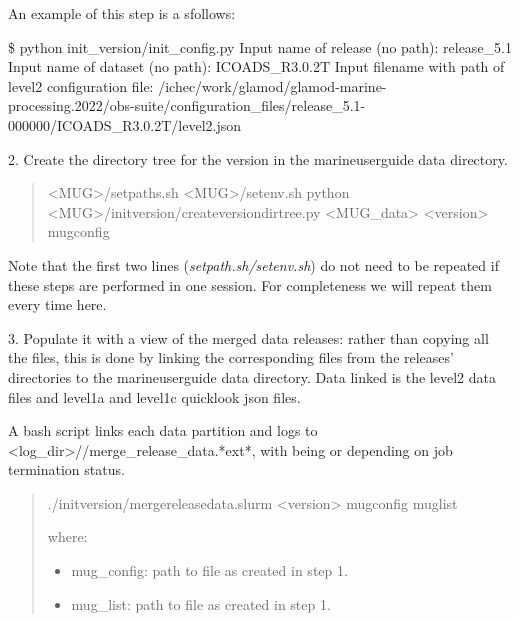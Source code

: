 \documentclass[letterpaper,10pt,english]{sphinxmanual}
\begin{document}
An example of this step is a sfollows:

\begin{sphinxVerbatim}[commandchars=\\\{\}]
\$ python init_version/init_config.py
Input name of release (no path): release_5.1
Input name of dataset (no path): ICOADS_R3.0.2T
Input filename with path of level2 configuration file: /ichec/work/glamod/glamod-marine-processing.2022/obs-suite/configuration_files/release_5.1-000000/ICOADS_R3.0.2T/level2.json
\end{sphinxVerbatim}

2. Create the directory tree for the version in the marine\sphinxhyphen{}user\sphinxhyphen{}guide data directory.
\begin{quote}

\begin{sphinxVerbatim}[commandchars=\\\{\}]
 <MUG>/setpaths.sh
 <MUG>/setenv.sh
python <MUG>/init\PYGZus{}version/create\PYGZus{}version\PYGZus{}dir\PYGZus{}tree.py <MUG\_data> <version> mug\PYGZus{}config
\end{sphinxVerbatim}

\end{quote}

Note that the first two lines (\textit{setpath.sh/setenv.sh}) do not need to be repeated if these steps are performed in one session. For completeness we will repeat them every time here.

3. Populate it with a view of the merged data releases: rather than copying all the files, this is done by linking the corresponding files from the releases’ directories to the marine\sphinxhyphen{}user\sphinxhyphen{}guide data directory. Data linked is the level2 data files and level1a and level1c quicklook json files.

A bash script links each data partition and logs to <log\_dir>//merge\_release\_data.*ext*, with  being  or
 depending on job termination status.
\begin{quote}

\begin{sphinxVerbatim}[commandchars=\\\{\}]
./init\PYGZus{}version/merge\PYGZus{}release\PYGZus{}data.slurm <version> mug\PYGZus{}config mug\PYGZus{}list
\end{sphinxVerbatim}

where:
\begin{itemize}
\item {} 
mug\_config: path to  file as created in step 1.

\item {} 
mug\_list: path to  file as created in step 1.

\end{itemize}
\end{quote}
\end{document}
